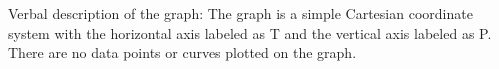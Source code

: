 Verbal description of the graph: The graph is a simple Cartesian coordinate system with the horizontal axis labeled as T and the vertical axis labeled as P. There are no data points or curves plotted on the graph.